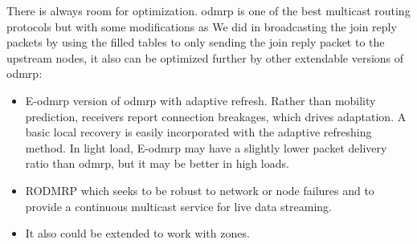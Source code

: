 There is always room for optimization. \acrshort{odmrp} is one of the best multicast routing protocols but with some modifications as We did in broadcasting the join reply packets by using the filled tables to only sending the join reply packet to the upstream nodes, it also can be optimized further by other extendable versions of \acrshort{odmrp}:
\begin{itemize}[itemsep=1pt, topsep=5pt]
    \item E-\acrshort{odmrp} version of \acrshort{odmrp} with adaptive refresh. Rather than mobility prediction, receivers report connection breakages, which drives adaptation. A basic local recovery is easily incorporated with the adaptive refreshing method. In light load, E-\acrshort{odmrp} may have a slightly lower packet delivery ratio than \acrshort{odmrp}, but it may be better in high loads.
    \item RODMRP which seeks to be robust to network or node failures and to provide a continuous multicast service for live data streaming.
    \item It also could be extended to work with zones.
\end{itemize}
